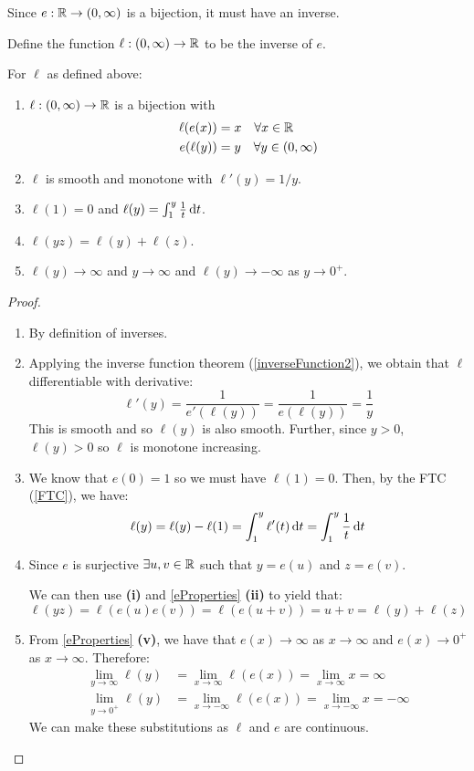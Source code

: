 \documentclass[../main.tex]{subfiles}
\begin{document}
Since $e: \mathbb{R} \to (0, \infty)$ is a bijection, it must have an inverse.
\begin{definition}
  Define the function $\ell: (0, \infty) \to \mathbb{R}$ to be the inverse of $e$.
\end{definition}
\begin{lemma}
  For $\ell$ as defined above: \label{lProperties}
  \begin{enumerate}
    \item $\ell: (0, \infty) \to \mathbb{R}$ is a bijection with
      \begin{align*}
        \ell(e(x)) &= x \quad \forall x \in \mathbb{R} \\
        e(\ell(y)) &= y \quad \forall y \in (0, \infty)
      \end{align*}
    \item $\ell$ is smooth and monotone with $\ell'(y) = 1/y$.
    \item $\ell(1) = 0$ and $\ell(y) = \int_{1}^{y} \frac{1}{t} \d{t}$.
    \item $\ell(yz) = \ell(y) + \ell(z)$.
    \item $\ell(y) \to \infty$ and $y \to \infty$ and $\ell(y) \to -\infty$ as $y \to 0^{+}$.
  \end{enumerate}
\end{lemma}
\begin{proof}
  \begin{enumerate}
    \item By definition of inverses.
    \item Applying the inverse function theorem (\cref{inverseFunction2}), we obtain that $\ell$ differentiable with derivative:
      \[
        \ell'(y) = \frac{1}{e'(\ell(y))} = \frac{1}{e(\ell(y))} = \frac{1}{y}
      \]
      This is smooth and so $\ell(y)$ is also smooth. Further, since $y > 0$, $\ell(y) > 0$ so $\ell$ is monotone increasing.
    \item We know that $e(0) = 1$ so we must have $\ell(1) = 0$.
      Then, by the FTC (\cref{FTC}), we have:
      \[
        \ell(y) = \ell(y) - \ell(1) = \int_{1}^{y} \ell'(t) \d{t}  = \int_{1}^{y} \frac{1}{t} \d{t}
      \]
    \item Since $e$ is surjective $\exists u, v \in \mathbb{R}$ such that $y = e(u)$ and $z = e(v)$.

      We can then use \textbf{(i)} and \cref{eProperties} \textbf{(ii)} to yield that:
      \[
        \ell(yz) = \ell(e(u)e(v)) = \ell(e(u + v)) = u + v = \ell(y) + \ell(z)
      \]
    \item From \cref{eProperties} \textbf{(v)}, we have that $e(x) \to \infty$ as $x \to \infty$ and $e(x) \to 0^{+}$ as $x \to \infty$.
      Therefore:
      \begin{align*}
        \lim_{y \to \infty} \ell(y) &= \lim_{x \to \infty} \ell(e(x)) = \lim_{x \to \infty} x = \infty \\
        \lim_{y \to 0^{+}} \ell(y) &= \lim_{x \to -\infty} \ell(e(x)) = \lim_{x \to -\infty} x = -\infty
      \end{align*}
      We can make these substitutions as $\ell$ and $e$ are continuous.
  \end{enumerate}
\end{proof}
\end{document}
